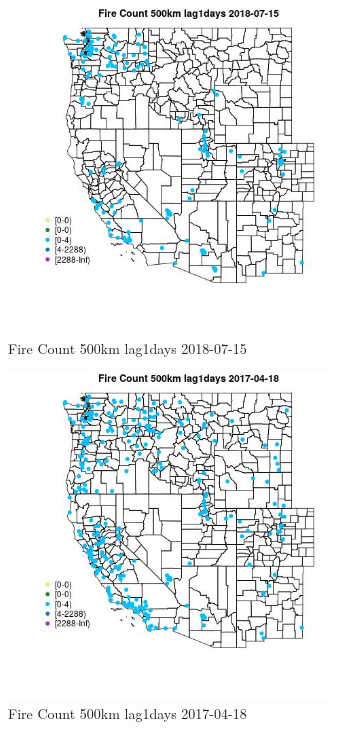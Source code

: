 \begin{figure} 
\centering  
\includegraphics[width=0.77\textwidth]{Code_Outputs/Report_ML_input_PM25_Step4_part_e_de_duplicated_aves_compiled_2019-05-21wNAs_MapObsFire_Count_500km_lag1days2018-07-15.jpg} 
\caption{\label{fig:Report_ML_input_PM25_Step4_part_e_de_duplicated_aves_compiled_2019-05-21wNAsMapObsFire_Count_500km_lag1days2018-07-15}Fire Count 500km lag1days 2018-07-15} 
\end{figure} 
 

\begin{figure} 
\centering  
\includegraphics[width=0.77\textwidth]{Code_Outputs/Report_ML_input_PM25_Step4_part_e_de_duplicated_aves_compiled_2019-05-21wNAs_MapObsFire_Count_500km_lag1days2017-04-18.jpg} 
\caption{\label{fig:Report_ML_input_PM25_Step4_part_e_de_duplicated_aves_compiled_2019-05-21wNAsMapObsFire_Count_500km_lag1days2017-04-18}Fire Count 500km lag1days 2017-04-18} 
\end{figure} 
 

